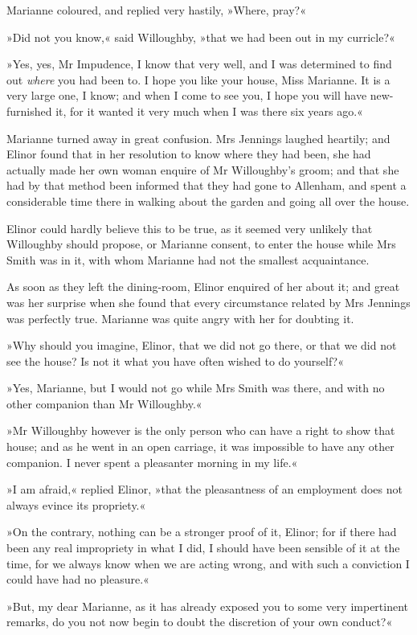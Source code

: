 Marianne coloured, and replied very hastily, »Where, pray?«

»Did not you know,« said Willoughby, »that we had been out in my curricle?«

»Yes, yes, Mr Impudence, I know that very well, and I was determined to find out \textit{where} you had been to. I hope you like your house, Miss Marianne. It is a very large one, I know; and when I come to see you, I hope you will have new-furnished it, for it wanted it very much when I was there six years ago.«

Marianne turned away in great confusion. Mrs Jennings laughed heartily; and Elinor found that in her resolution to know where they had been, she had actually made her own woman enquire of Mr Willoughby’s groom; and that she had by that method been informed that they had gone to Allenham, and spent a considerable time there in walking about the garden and going all over the house.

Elinor could hardly believe this to be true, as it seemed very unlikely that Willoughby should propose, or Marianne consent, to enter the house while Mrs Smith was in it, with whom Marianne had not the smallest acquaintance.

As soon as they left the dining-room, Elinor enquired of her about it; and great was her surprise when she found that every circumstance related by Mrs Jennings was perfectly true. Marianne was quite angry with her for doubting it.

»Why should you imagine, Elinor, that we did not go there, or that we did not see the house? Is not it what you have often wished to do yourself?«

»Yes, Marianne, but I would not go while Mrs Smith was there, and with no other companion than Mr Willoughby.«

»Mr Willoughby however is the only person who can have a right to show that house; and as he went in an open carriage, it was impossible to have any other companion. I never spent a pleasanter morning in my life.«

»I am afraid,« replied Elinor, »that the pleasantness of an employment does not always evince its propriety.«

»On the contrary, nothing can be a stronger proof of it, Elinor; for if there had been any real impropriety in what I did, I should have been sensible of it at the time, for we always know when we are acting wrong, and with such a conviction I could have had no pleasure.«

»But, my dear Marianne, as it has already exposed you to some very impertinent remarks, do you not now begin to doubt the discretion of your own conduct?«

